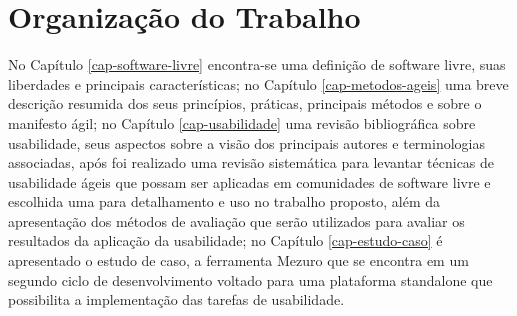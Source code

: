 \section{Organização do Trabalho}
No Capítulo \ref{cap-software-livre} encontra-se uma definição de software 
livre, suas liberdades e principais características; no Capítulo \ref{cap-metodos-ageis} uma breve descrição resumida dos seus princípios, práticas, 
principais métodos e sobre o manifesto ágil; no Capítulo \ref{cap-usabilidade} uma revisão bibliográfica sobre usabilidade, seus aspectos 
sobre a visão dos principais autores e terminologias associadas, após foi 
realizado uma revisão sistemática para levantar técnicas de usabilidade 
ágeis que possam ser aplicadas em comunidades de software livre e 
escolhida uma para detalhamento e uso no trabalho proposto, além da 
apresentação dos métodos de avaliação que serão utilizados para avaliar os 
resultados da aplicação da usabilidade; no Capítulo \ref{cap-estudo-caso} é 
apresentado o estudo de caso, a ferramenta Mezuro que se encontra em um 
segundo ciclo de desenvolvimento voltado para uma plataforma standalone que possibilita a implementação das tarefas de usabilidade. 
